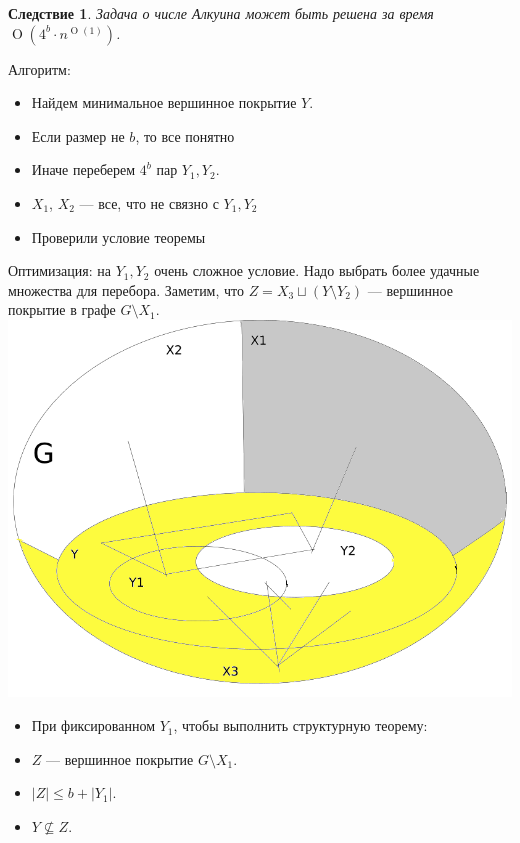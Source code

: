 \documentclass{beamer}
\newtheorem{cl}{Следствие}
\theoremstyle{definition}
\newcommand{\otime}[1]{\operatorname{O}(#1)}
\newcommand{\opoly}[1]{\otime{#1\cdot n^{\otime{1}}}}
\begin{document}
\begin{frame}
\begin{cl}
Задача о числе Алкуина может быть решена за время $\opoly{4^b}$. 
\end{cl}
Алгоритм:
\begin{itemize}
\item Найдем минимальное вершинное покрытие $Y$.
\item Если размер не $b$, то все понятно
\item Иначе переберем $4^b$ пар $Y_1, Y_2$.
\item $X_1$, $X_2$ --- все, что не связно с $Y_1, Y_2$
\item Проверили условие теоремы
\end{itemize}
\end{frame}

\begin{frame}
Оптимизация: на $Y_1, Y_2$ очень сложное условие. Надо выбрать более удачные множества для перебора.
 Заметим, что $Z = X_3 \sqcup (Y \setminus Y_2)$ --- вершинное покрытие в графе $G \setminus X_1$.
 \includegraphics[scale = 0.2]{structure2.png}
\end{frame}
\begin{frame}
\begin{itemize}
\item При фиксированном $Y_1$, чтобы выполнить структурную теорему:
\item $Z$ --- вершинное покрытие $G \setminus X_1$.
\item $|Z| \le b + |Y_1|$.
\item $Y \nsubseteq Z$.
\end{itemize}
\end{frame}
\end{document}
